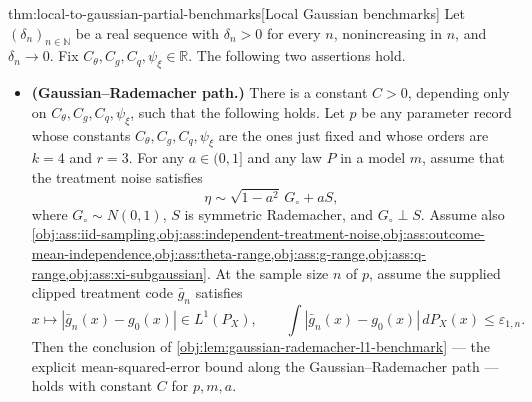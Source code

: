 \begin{theoremv}{thm:local-to-gaussian-partial-benchmarks}[Local Gaussian benchmarks]
Let \((\delta_n)_{n\in\mathbb N}\) be a real sequence with \(\delta_n>0\) for every \(n\), nonincreasing in \(n\), and \(\delta_n\to0\).  Fix \(C_{\theta},C_g,C_q,\psi_{\xi}\in\mathbb R\).  The following two assertions hold.

\begin{itemize}
\item \textbf{(Gaussian--Rademacher path.)} There is a constant \(C>0\), depending only on \(C_{\theta},C_g,C_q,\psi_{\xi}\), such that the following holds.  Let \(p\) be any parameter record whose constants \(C_{\theta},C_g,C_q,\psi_{\xi}\) are the ones just fixed and whose orders are \(k=4\) and \(r=3\).  For any \(a\in(0,1]\) and any law \(P\) in a model \(m\), assume that the treatment noise satisfies
\[
\eta\sim \sqrt{1-a^2}\,G_{\circ}+aS,
\]
where \(G_{\circ}\sim N(0,1)\), \(S\) is symmetric Rademacher, and \(G_{\circ}\perp S\).  Assume also \cref{obj:ass:iid-sampling,obj:ass:independent-treatment-noise,obj:ass:outcome-mean-independence,obj:ass:theta-range,obj:ass:g-range,obj:ass:q-range,obj:ass:xi-subgaussian}.  At the sample size \(n\) of \(p\), assume the supplied clipped treatment code \(\bar g_n\) satisfies
\[
x\mapsto |\bar g_n(x)-g_0(x)|\in L^1(P_X),
\qquad
\int |\bar g_n(x)-g_0(x)|\,dP_X(x)\le \varepsilon_{1,n}.
\]
Then the conclusion of \cref{obj:lem:gaussian-rademacher-l1-benchmark} — the explicit mean-squared-error bound along the Gaussian--Rademacher path — holds with constant \(C\) for \(p,m,a\).


\end{itemize}
\end{theoremv}
